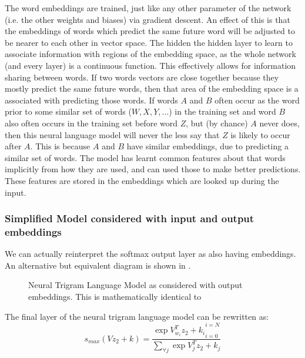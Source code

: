 \documentclass[parskip]{komatufte}
\begin{document}
The word embeddings are trained, just like any other parameter of the network (i.e. the other weights and biases) via gradient descent.
An effect of this is that the embeddings of words which predict the same future word will be adjusted to be nearer to each other in vector space.
The hidden the hidden layer to learn to associate information with regions of the embedding space, as the whole network (and every layer) is a continuous function.
This effectively allows for information sharing between words.
If two words vectors are close together because they mostly predict the same future words, then that area of the embedding space is a associated with predicting those words.
If words $A$ and $B$  often occur as the word prior to some similar set of words ($W,X,Y,\ldots$) in the training set
and word $B$ also often occurs in the training set before word $Z$, but (by chance) $A$ never does,
then this neural language model will never the less say that $Z$ is likely to occur after $A$.
This is because $A$ and $B$ have similar embeddings, due to predicting a similar set of words.
The model has learnt common features about that words implicitly from how they are used, and can used those to make better predictions.
These features are stored in the embeddings which are looked up during the input.

\subsubsection{Simplified Model considered with input and output embeddings}
We can actually reinterpret the softmax output layer as also having embeddings.
An alternative but equivalent diagram is shown in .

\begin{figure}
	\caption{Neural Trigram Language Model as considered with output embeddings. This is mathematically identical to }
	\label{fig:trigram-adv-neural-language-model}
	\centering
	 
\end{figure}

The final layer of the neural trigram language model can be rewritten as:
\begin{equation}
s_{max}(Vz_{2}+k) = \dfrac{\exp{V_{w_{i}}^{T}z_{2}+k_{i}}_{i=0}^{i=N}}{\sum_{\forall j}\exp{V_{j}^{T}z_{2}+k_{j}}}
\end{equation} 

\end{document}
